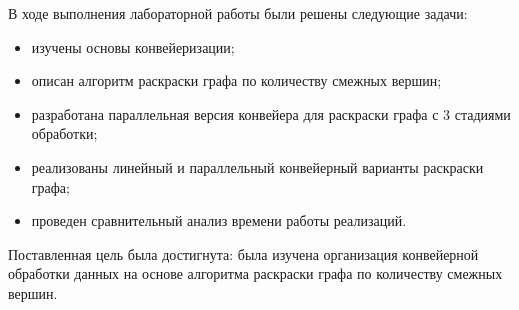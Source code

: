 \vspace{\baselineskip}

В ходе выполнения лабораторной работы были решены следующие задачи:

\begin{itemize}[label=---]
	\item изучены основы конвейеризации;
	\item описан алгоритм раскраски графа по количеству смежных вершин;
	\item разработана параллельная версия конвейера для раскраски графа с 3 стадиями обработки;
	\item реализованы линейный и параллельный конвейерный варианты раскраски графа;
	\item проведен сравнительный анализ времени работы реализаций.
\end{itemize}

Поставленная цель была достигнута: была изучена организация конвейерной обработки данных на основе алгоритма раскраски графа по количеству смежных вершин.